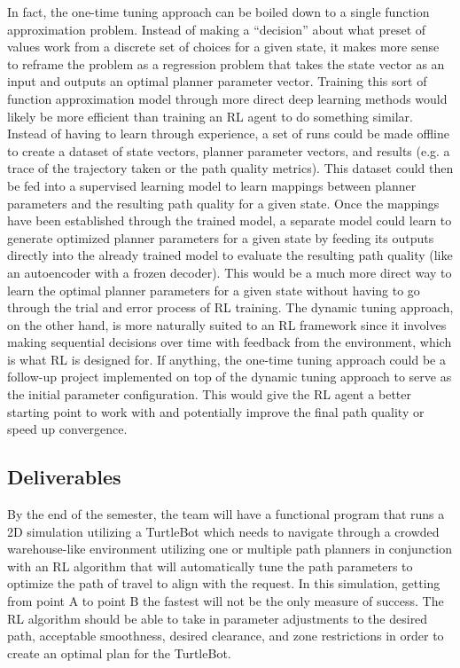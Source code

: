 \documentclass[conference]{IEEEtran}
\begin{document}
        In fact, the one-time tuning approach can be boiled down to a single function approximation problem. Instead of making a ``decision'' about what preset of values work from a discrete set of choices for a given state, it makes more sense to reframe the problem as a regression problem that takes the state vector as an input and outputs an optimal planner parameter vector. Training this sort of function approximation model through more direct deep learning methods would likely be more efficient than training an RL agent to do something similar. Instead of having to learn through experience, a set of runs could be made offline to create a dataset of state vectors, planner parameter vectors, and results (e.g. a trace of the trajectory taken or the path quality metrics). This dataset could then be fed into a supervised learning model to learn mappings between planner parameters and the resulting path quality for a given state. Once the mappings have been established through the trained model, a separate model could learn to generate optimized planner parameters for a given state by feeding its outputs directly into the already trained model to evaluate the resulting path quality (like an autoencoder with a frozen decoder). This would be a much more direct way to learn the optimal planner parameters for a given state without having to go through the trial and error process of RL training. The dynamic tuning approach, on the other hand, is more naturally suited to an RL framework since it involves making sequential decisions over time with feedback from the environment, which is what RL is designed for. If anything, the one-time tuning approach could be a follow-up project implemented on top of the dynamic tuning approach to serve as the initial parameter configuration. This would give the RL agent a better starting point to work with and potentially improve the final path quality or speed up convergence.

    \subsection{Deliverables}
    By the end of the semester, the team will have a functional program that runs a 2D simulation utilizing a TurtleBot which needs to navigate through a crowded warehouse-like environment utilizing one or multiple path planners in conjunction with an RL algorithm that will automatically tune the path parameters to optimize the path of travel to align with the request. In this simulation, getting from point A to point B the fastest will not be the only measure of success. The RL algorithm should be able to take in parameter adjustments to the desired path, acceptable smoothness, desired clearance, and zone restrictions in order to create an optimal plan for the TurtleBot.
\end{document}
